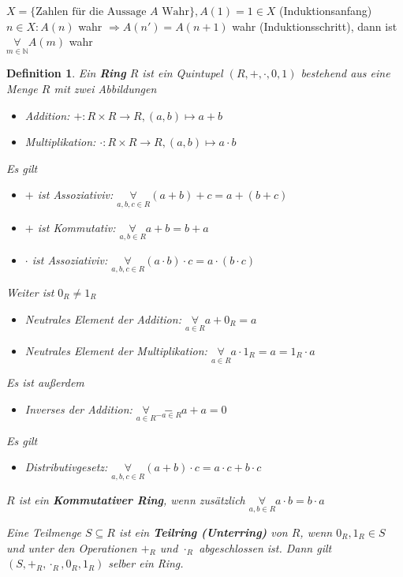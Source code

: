 \documentclass{article}
\newtheorem{defi}[thm]{Definition}
\newcommand{\N}{\mathbb{N}}
\begin{document}
$X=\{\text{Zahlen für die Aussage $A$ Wahr}\}, A(1)=1\in X$
(Induktionsanfang)\\
$n\in X:A(n)$ wahr $\Rightarrow A(n')=A(n+1)$ wahr
(Induktionsschritt), dann ist
$\underset{m\in\N}\forall A(m)$ wahr
\color{black}
\begin{defi}
    Ein \textbf{Ring} $R$ ist ein Quintupel $(R,+,\cdot,0,1)$
    bestehend aus eine Menge $R$ mit zwei Abbildungen
    \begin{itemize}
        \item
            Addition:
               $+:R\times R\rightarrow R,(a,b)\mapsto a+b$
        \item
            Multiplikation:
               $\cdot:R\times R\rightarrow R,(a,b)
            \mapsto a\cdot b$
    \end{itemize}
    Es gilt
    \begin{itemize}
        \item
            $+$ ist Assoziativiv:
            $\underset{a,b,c\in R}\forall (a+b)+c=a+(b+c)$
        \item
            $+$ ist Kommutativ:
            $\underset{a,b\in R}\forall a+b=b+a$
        \item
            $\cdot$ ist Assoziativiv:
            $\underset{a,b,c\in R}\forall
            (a\cdot b)\cdot c=a\cdot (b\cdot c)$
    \end{itemize}
    Weiter ist $0_R\neq 1_R$
    \begin{itemize}
        \item
            Neutrales Element der Addition:
            $\underset{a\in R}\forall a+0_R=a$
        \item
            Neutrales Element der Multiplikation:
            $\underset{a\in R}\forall a\cdot 1_R=a=1_R\cdot a$
    \end{itemize}
    Es ist außerdem
    \begin{itemize}
        \item
            Inverses der Addition: $\underset{a\in R}\forall
            \underset{-a\in R}-a+a=0$
    \end{itemize}
    Es gilt
    \begin{itemize}
        \item
            Distributivgesetz:
            $\underset{a,b,c\in R}\forall
            (a+b)\cdot c=a\cdot c+b\cdot c$
    \end{itemize}
    \color{blue}
    $R$ ist ein \textbf{Kommutativer Ring}, wenn zusätzlich
    $\underset{a,b\in R}\forall a\cdot b=b\cdot a$
    \color{black}

    Eine Teilmenge $S\subseteq R$ ist ein
    \textbf{Teilring (Unterring)} von $R$, wenn $0_R,1_R\in S$
    und unter den Operationen $+_R$ und $\cdot_R$
    abgeschlossen ist. Dann gilt
    $(S,+_R,\cdot_R,0_R,1_R)$ selber ein Ring.
\end{defi}
\end{document}
